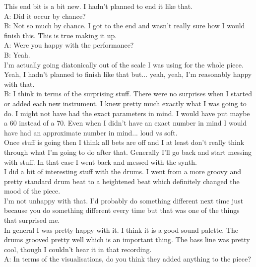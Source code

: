 This end bit is a bit new. I hadn't planned to end it like that.\\

A: Did it occur by chance?\\

B: Not so much by chance. I got to the end and wasn't really sure how I would finish this. This is true making it up.\\

A: Were you happy with the performance?\\

B: Yeah.\\

I'm actually going diatonically out of the scale I was using for the whole piece.\\

Yeah, I hadn't planned to finish like that but... yeah, yeah, I'm reasonably happy with that.\\

B: I think in terms of the surprising stuff. There were no surprises when I started or added each new instrument. I knew pretty much exactly what I was going to do. I might not have had the exact parameters in mind. I would have put maybe a 60 instead of a 70. Even when I didn't have an exact number in mind I would have had an approximate number in mind... loud vs soft.\\

Once stuff is going then I think all bets are off and I at least don't really think through what I'm going to do after that. Generally I'll go back and start messing with stuff. In that case I went back and messed with the synth.\\

I did a bit of interesting stuff with the drums. I went from a more groovy and pretty standard drum beat to a heightened beat which definitely changed the mood of the piece.\\

I'm not unhappy with that. I'd probably do something different next time just because you do something different every time but that was one of the things that surprised me.\\

In general I was pretty happy with it. I think it is a good sound palette. The drums grooved pretty well which is an important thing. The bass line was pretty cool, though I couldn't hear it in that recording.\\

A: In terms of the visualisations, do you think they added anything to the piece?\\

